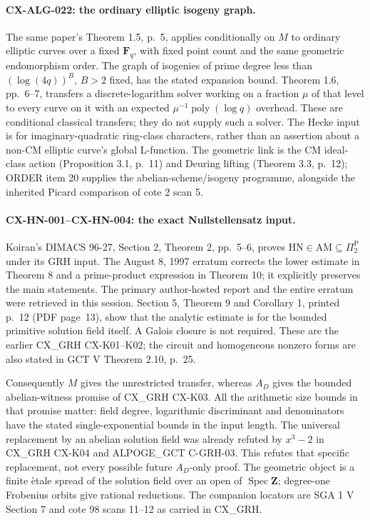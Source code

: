 \documentclass[11pt,a4paper]{article}
\begin{document}
\paragraph{CX-ALG-022: the ordinary elliptic isogeny graph.}
The same paper's Theorem 1.5, p.~5, applies conditionally on $M$ to ordinary
elliptic curves over a fixed $\mathbf F_q$, with fixed point count and
the same geometric endomorphism order. The graph of isogenies of prime
degree less than $(\log(4q))^B$, $B>2$ fixed, has the stated expansion
bound. Theorem 1.6, pp.~6--7, transfers a discrete-logarithm solver working
on a fraction $\mu$ of that level to every curve on it with an expected
$\mu^{-1}\operatorname{poly}(\log q)$ overhead. These are conditional
classical transfers; they do not supply such a solver. The Hecke input is
for imaginary-quadratic ring-class characters, rather than an assertion
about a non-CM elliptic curve's global L-function. The geometric link is
the CM ideal-class action (Proposition 3.1, p.~11) and Deuring lifting
(Theorem 3.3, p.~12); ORDER item 20 supplies the abelian-scheme/isogeny
programme, alongside the inherited Picard comparison of cote 2 scan 5.

\paragraph{CX-HN-001--CX-HN-004: the exact Nullstellensatz input.}
Koiran's DIMACS 96-27, Section 2, Theorem 2, pp.~5--6, proves
$\mathrm{HN}\in\mathrm{AM}\subseteq\Pi_2^{\mathrm P}$ under its GRH input.
The August 8, 1997 erratum corrects the lower estimate in Theorem 8 and a
prime-product expression in Theorem 10; it explicitly preserves the main
statements. The primary author-hosted report and the entire erratum were
retrieved in this session. Section 5, Theorem 9 and Corollary 1, printed p.~12 (PDF page~13),
show that the analytic estimate is for the bounded primitive solution
field itself. A Galois closure is not required. These are the earlier
CX\_GRH CX-K01--K02; the circuit and homogeneous nonzero forms are also
stated in GCT V Theorem 2.10, p.~25.

Consequently $M$ gives the unrestricted transfer, whereas $A_D$ gives the
bounded abelian-witness promise of CX\_GRH CX-K03. All the arithmetic size
bounds in that promise matter: field degree, logarithmic discriminant and
denominators have the stated single-exponential bounds in the input length.
The universal replacement by an abelian solution field was already refuted
by $x^3-2$ in CX\_GRH CX-K04 and ALPOGE\_GCT C-GRH-03. This refutes that
specific replacement, not every possible future $A_D$-only proof.
The geometric object is a finite \`etale spread of the solution field over
an open of $\operatorname{Spec}\mathbf Z$; degree-one Frobenius orbits give
rational reductions. The companion locators are SGA 1 V Section 7 and
cote 98 scans 11--12 as carried in CX\_GRH.
\end{document}
